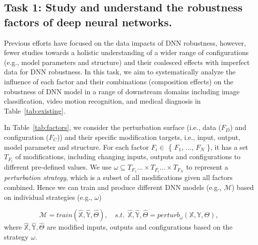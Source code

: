 \ei

 \subsection{Task 1: Study and understand the robustness factors of deep neural networks.}\label{4.1}


Previous efforts have focused on the data impacts of DNN robustness, however, fewer studies towards a holistic understanding of a wider range of configurations (e.g., model parameters and structure) and their coalesced effects with imperfect data for DNN robustness. 
In this task, we aim to systematically analyze the influence of each factor and their combinations (composition effects) on the robustness of DNN model in a range of downstream domains including image classification, video motion recognition, and medical diagnosis in Table~\ref{tab:existing}. 

In Table~\ref{tab:factors}, we consider the perturbation surface (i.e., data ($F_D$) and configuration ($F_C$)) and their specific modification targets, i.e., input, output, model parameter and structure. 
For each factor $F_i \in $ \{ $F_1$, $\dots$, $F_N$ \}, 
it has a set $T_{F_i}$ of modifications, including changing inputs, outputs and configurations to different pre-defined values. 
We use $\omega \subseteq T_{F_1}\dots\times T_{F_i}\dots \times T_{F_N}$ to represent a \emph{perturbation strategy}, which is a subset of all modifications given all factors combined. Hence we can train and produce different DNN models (e.g., $\mathcal{M}$) based on individual strategies (e.g., $\omega$) 

\begin{equation}
\label{eq:perturb_train}
    \mathcal{M}=train(\hat{\mathbb{X}},\hat{\mathbb{Y}}, \hat{\Theta}), \quad  s.t. \ \
    \hat{\mathbb{X}},\hat{\mathbb{Y}}, \hat{\Theta} = perturb_{\omega}(\mathbb{X},\mathbb{Y},\Theta),
\end{equation}
where $\hat{\mathbb{X}}, \hat{\mathbb{Y}}, \hat{\Theta}$ are modified inputs, outputs and configurations based on the strategy $\omega$.

